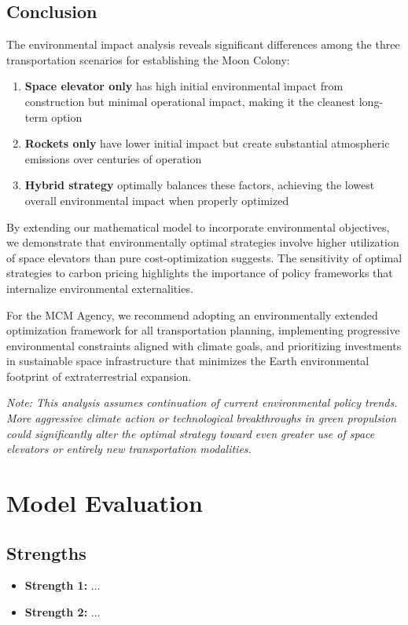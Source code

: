 \documentclass{mcmthesis}
\begin{document}
\subsection{Conclusion}

The environmental impact analysis reveals significant differences among the three transportation scenarios for establishing the Moon Colony:

\begin{enumerate}
    \item \textbf{Space elevator only} has high initial environmental impact from construction but minimal operational impact, making it the cleanest long-term option
    \item \textbf{Rockets only} have lower initial impact but create substantial atmospheric emissions over centuries of operation
    \item \textbf{Hybrid strategy} optimally balances these factors, achieving the lowest overall environmental impact when properly optimized
\end{enumerate}

By extending our mathematical model to incorporate environmental objectives, we demonstrate that environmentally optimal strategies involve higher utilization of space elevators than pure cost-optimization suggests. The sensitivity of optimal strategies to carbon pricing highlights the importance of policy frameworks that internalize environmental externalities.

For the MCM Agency, we recommend adopting an environmentally extended optimization framework for all transportation planning, implementing progressive environmental constraints aligned with climate goals, and prioritizing investments in sustainable space infrastructure that minimizes the Earth environmental footprint of extraterrestrial expansion.

\noindent\textit{Note: This analysis assumes continuation of current environmental policy trends. More aggressive climate action or technological breakthroughs in green propulsion could significantly alter the optimal strategy toward even greater use of space elevators or entirely new transportation modalities.}

\section{Model Evaluation}

\subsection{Strengths}
\begin{itemize}
    \item \textbf{Strength 1:} ...
    \item \textbf{Strength 2:} ...
\end{itemize}
\end{document}
